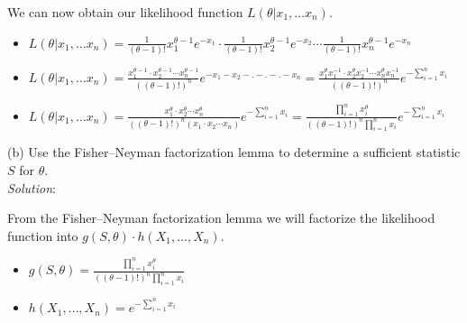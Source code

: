 \documentclass[12pt]{article}
\newcommand{\XB}{\color{black}}
\newcommand{\XV}{\color{violet}}
\begin{document}
\noindent
We can now obtain our likelihood function $ L(\theta | x_{1}, \dots x_{n}) $. \\
\begin{itemize}
    \item $ \displaystyle L(\theta | x_{1}, \dots x_{n}) = \frac{1}{(\theta - 1)!}x_{1}^{\theta - 1}e^{-x_{1}} \cdot \frac{1}{(\theta - 1)!}x_{2}^{\theta - 1}e^{-x_{2}} \cdots \frac{1}{(\theta - 1)!}x_{n}^{\theta - 1}e^{-x_{n}} $
    \item $ \displaystyle L(\theta | x_{1}, \dots x_{n}) = \frac{x_{1}^{\theta - 1} \cdot x_{2}^{\theta - 1} \cdots x_{n}^{\theta - 1}}{((\theta - 1)!)^{n}}e^{-x_{1} -x_{2} - . - . - . -x_{n}} = \frac{ x_{1}^{\theta} x_{1}^{-1} \cdot x_{2}^{\theta} x_{2}^{-1} \cdots x_{n}^{\theta} x_{n}^{-1}}{((\theta - 1)!)^{n}}e^{-\sum_{i=1}^{n} x_{i}} $
    \item $ \displaystyle L(\theta | x_{1}, \dots x_{n}) = \frac{ x_{1}^{\theta} \cdot x_{2}^{\theta} \cdots x_{n}^{\theta}}{((\theta - 1)!)^{n}(x_{1} \cdot x_{2} \cdots x_{n})}e^{-\sum_{i=1}^{n} x_{i}} = \frac{ \prod_{i=1}^{n} x_{i}^{\theta}}{((\theta - 1)!)^{n}\prod_{i=1}^{n} x_{i}}e^{-\sum_{i=1}^{n} x_{i}} $
\end{itemize}



(b) Use the Fisher–Neyman factorization lemma to determine a sufficient statistic $ S $ for $ \theta $.
\vspace{2.5mm} \\
\textit{Solution}:
\vspace{2.5mm}

\noindent
From the Fisher–Neyman factorization lemma we will factorize the likelihood function into $ g(S, \theta) \cdot h(X_{1}, \dots , X_{n}) $. \\

\begin{itemize}
    \item $ \displaystyle g(S, \theta) = \frac{ \prod_{i=1}^{n} x_{i}^{\theta}}{((\theta - 1)!)^{n}\prod_{i=1}^{n} x_{i}} $
    \item $ \displaystyle h(X_{1}, \dots , X_{n}) = e^{-\sum_{i=1}^{n} x_{i}} $
\end{itemize}
\end{document}
